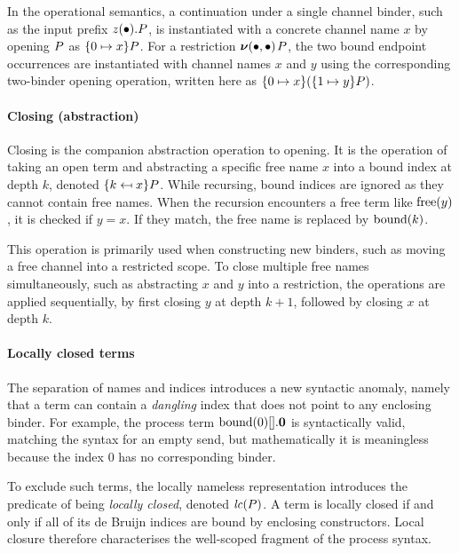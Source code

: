 In the operational semantics, a continuation under a single channel binder, such as the input prefix {${{z(\bullet)}{.}P}$}, is instantiated with a concrete channel name $x$ by opening {$P$} as $\{0 \mapsto x\}P$. For a restriction {${\boldsymbol{\nu}{(\bullet, \bullet)}\mspace{2mu}}{P}$}, the two bound endpoint occurrences are instantiated with channel names $x$ and $y$ using the corresponding two-binder opening operation, written here as {$\{0 \mapsto x\}(\{1 \mapsto y\}P)$}.

\paragraph{Closing (abstraction)} Closing is the companion abstraction operation to opening. It is the operation of taking an open term and abstracting a specific free name $x$ into a bound index at depth $k$, denoted {$\{k \mapsfrom x\}P$}. While recursing, bound indices are ignored as they cannot contain free names. When the recursion encounters a free term like $\text{free}(y)$, it is checked if $y = x$. If they match, the free name is replaced by $\text{bound}(k)$.

This operation is primarily used when constructing new binders, such as moving a free channel into a restricted scope. To close multiple free names simultaneously, such as abstracting $x$ and $y$ into a restriction, the operations are applied sequentially, by first closing $y$ at depth $k+1$, followed by closing $x$ at depth $k$.

\paragraph{Locally closed terms} The separation of names and indices introduces a new syntactic anomaly, namely that a term can contain a \emph{dangling} index that does not point to any enclosing binder. For example, the process term {${{\text{bound}(0)[]}{.}\mathbf{0}}$} is syntactically valid, matching the syntax for an empty send, but mathematically it is meaningless because the index $0$ has no corresponding binder.

To exclude such terms, the locally nameless representation introduces the predicate of being \emph{locally closed}, denoted {$\mathit{lc}(P)$}. A term is locally closed if and only if all of its de Bruijn indices are bound by enclosing constructors. Local closure therefore characterises the well-scoped fragment of the process syntax.

